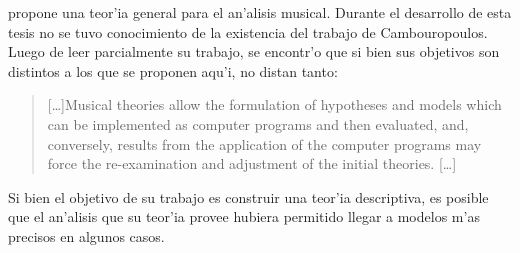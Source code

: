 %

\cite{Cambouropoulos98} propone una teor'ia general para el an'alisis musical. Durante el desarrollo de esta tesis no se tuvo conocimiento de la existencia del trabajo de Cambouropoulos.
Luego de leer parcialmente su trabajo, se encontr'o que si bien sus objetivos son distintos a los que se proponen aqu'i, no distan tanto: 
\begin{quote}
[\ldots]Musical theories allow the formulation of hypotheses and models which can be implemented
as computer programs and then evaluated, and, conversely, results from the application of the
computer programs may force the re-examination and adjustment of the initial theories. [\ldots]
\end{quote} 
Si bien el objetivo de su trabajo es construir una teor'ia descriptiva, es posible que el an'alisis que su teor'ia provee hubiera permitido llegar a modelos m'as precisos 
en algunos casos. 

%
%

